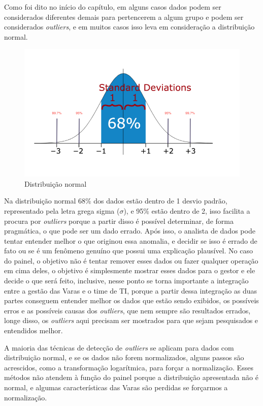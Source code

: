 Como foi dito no início do capítulo, em alguns casos dados podem ser considerados diferentes demais para pertencerem a algum grupo e podem ser considerados \textit{outliers}, e em muitos casos isso leva em consideração a distribuição normal. 

\begin{figure}[h]
	\centering
	\includegraphics[scale=0.50]{./figures/cap3/dist_normal.png}
	\caption{Distribuição normal}
\end{figure}

Na distribuição normal 68\% dos dados estão dentro de 1 desvio padrão, representado pela letra grega sigma ($\sigma$), e 95\% estão dentro de 2, isso facilita a procura por \textit{outliers} porque a partir disso é possível determinar, de forma pragmática, o que pode ser um dado errado. Após isso, o analista de dados pode tentar entender melhor o que originou essa anomalia, e decidir se isso é errado de fato ou se é um fenômeno genuíno que possui uma explicação plausível. No caso do painel, o objetivo não é tentar remover esses dados ou fazer qualquer operação em cima deles, o objetivo é simplesmente mostrar esses dados para o gestor e ele decide o que será feito, inclusive, nesse ponto se torna importante a integração entre a gestão das Varas e o time de TI, porque a partir dessa integração as duas partes conseguem entender melhor os dados que estão sendo exibidos, os possíveis erros e as possíveis causas dos \textit{outliers}, que nem sempre são resultados errados, longe disso, os \textit{outliers} aqui precisam ser mostrados para que sejam pesquisados e entendidos melhor.

A maioria das técnicas de detecção de \textit{outliers} se aplicam para dados com distribuição normal, e se os dados não forem normalizados, alguns passos são acrescidos, como a transformação logarítmica, para forçar a normalização. Esses métodos não atendem à função do painel porque a distribuição apresentada não é normal, e algumas características das Varas são perdidas se forçarmos a normalização.
